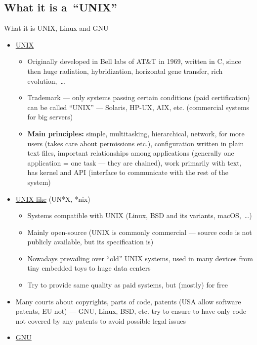 \documentclass[compress, ucs, xelatex, 11pt, xcolor=svgnames, aspectratio=169,
	hyperref={
		bookmarks=true,
		unicode=true,
		colorlinks=true,
		pdftitle={Linux, command line and MetaCentrum},
		plainpages=false,
		pdfauthor={Vojtech Zeisek},
		pdfsubject={Course about use of Linux command line, writing shell scripts and using MetaCentrum of CESNET},
		pdfcreator={XeLaTeX},
		pdfkeywords={Linux, GNU, BASH, shell, command line, MetaCentrum},
		linkcolor=DarkRed, %
		anchorcolor=DarkBlue, %
		citecolor=Indigo, %
		filecolor=NavyBlue, %
		menucolor=DarkMagenta, %
		urlcolor=DarkBlue, %
		pdftex},
	url={hyphens, lowtilde} %
	]{beamer}
\begin{document}
\subsection{What it is a~\enquote{UNIX}}

\begin{frame}[allowframebreaks]{What it is UNIX, Linux and GNU}
	\begin{itemize}
		\item \href{https://en.wikipedia.org/wiki/Unix}{UNIX}
		\begin{itemize}
			\item Originally developed in Bell labs of AT\&T in 1969, written in C, since then  huge radiation, hybridization, horizontal gene transfer, rich evolution,~\ldots
			\item Trademark --- only systems passing certain conditions (paid certification) can be called \enquote{UNIX} --- Solaris, HP-UX, AIX, etc. (commercial systems for big servers)
			\item \textbf{Main principles:} simple, multitasking, hierarchical, network, for more users (takes care about permissions etc.), configuration written in plain text files, important relationships among applications (generally one application = one task --- they are chained), work primarily with text, has kernel and API (interface to communicate with the rest of the system)
		\end{itemize}
		\item \href{https://en.wikipedia.org/wiki/Unix-like}{UNIX-like} (UN*X, *nix)
		\begin{itemize}
			\item Systems compatible with UNIX (Linux, BSD and its variants, macOS,~\ldots)
			\item Mainly open-source (UNIX is commonly commercial --- source code is not publicly available, but its specification is)
			\item Nowadays prevailing over \enquote{old} UNIX systems, used in many devices from tiny embedded toys to huge data centers
			\item Try to provide same quality as paid systems, but (mostly) for free
		\end{itemize}
		\item Many courts about copyrights, parts of code, patents (USA allow software patents, EU not) --- GNU, Linux, BSD, etc. try to ensure to have only code not covered by any patents to avoid possible legal issues
		\item \href{https://www.gnu.org/}{GNU}

\end{itemize}
\end{frame}
\end{document}
